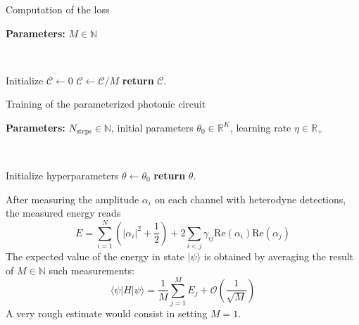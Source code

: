 \documentclass[reprint, amsmath, amssymb, aps]{revtex4-2}
\begin{document}
    \begin{algorithm}
        \caption{Computation of the loss}\label{alg:loss_computation}
            \textbf{Parameters:} $M\in\mathbb N$

            \

            Initialize $\mathcal C \gets 0$\;
                $\mathcal C \gets \mathcal C / M$\;
            \textbf{return} $\mathcal C$.
    \end{algorithm}

    \begin{algorithm}
        \caption{Training of the parameterized photonic circuit}\label{alg:training}
        \textbf{Parameters:} $N_\text{steps}\in\mathbb N$, initial parameters $\theta_0\in\mathbb R^K$, learning rate $\eta\in\mathbb R_+$

        \

        Initialize hyperparameters $\theta \gets \theta_0$\;
        \textbf{return} $\theta$.
    \end{algorithm}

    After measuring the amplitude $\alpha_i$ on each channel with heterodyne detections, the measured energy reads
    \begin{equation}
    \label{eq:energy_coherent}
        E = \sum_{i=1}^N\left(|\alpha_i|^2+\frac{1}{2}\right) + 2\sum_{i<j}\gamma_{ij}\text{Re}(\alpha_i)\text{Re}(\alpha_j)
    \end{equation}
    The expected value of the energy in state $|\psi\rangle$ is obtained by averaging the result of $M\in\mathbb N$ such measurements:
    \begin{equation}
        \langle\psi|H|\psi\rangle = \frac{1}{M}\sum_{j=1}^M E_j + \mathcal O\left(\frac{1}{\sqrt M}\right)
    \end{equation}
    A very rough estimate would consist in setting $M=1$.
\end{document}
